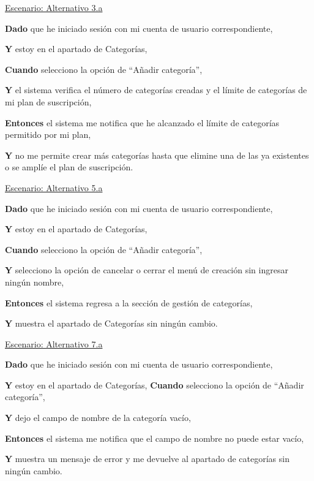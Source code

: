 \vspace{0.20cm}



\underline{Escenario: Alternativo 3.a}\par
\vspace{0.15cm}

\textbf{Dado} que he iniciado sesión con mi cuenta de usuario correspondiente,\par
\textbf{Y} estoy en el apartado de Categorías,\par
\textbf{Cuando} selecciono la opción de \enquote{Añadir categoría},\par
\textbf{Y} el sistema verifica el número de categorías creadas y el límite de categorías de mi plan de suscripción,\par
\textbf{Entonces} el sistema me notifica que he alcanzado el límite de categorías permitido por mi plan,\par
\textbf{Y} no me permite crear más categorías hasta que elimine una de las ya existentes o se amplíe el plan de suscripción.\par
\vspace{0.20cm}

\underline{Escenario: Alternativo 5.a}\par
\vspace{0.15cm}

\textbf{Dado} que he iniciado sesión con mi cuenta de usuario correspondiente,\par
\textbf{Y} estoy en el apartado de Categorías,\par
\textbf{Cuando} selecciono la opción de \enquote{Añadir categoría},\par
\textbf{Y} selecciono la opción de cancelar o cerrar el menú de creación sin ingresar ningún nombre,\par
\textbf{Entonces} el sistema regresa a la sección de gestión de categorías,\par
\textbf{Y} muestra el apartado de Categorías sin ningún cambio.\par

\vspace{0.20cm}

\underline{Escenario: Alternativo 7.a}\par
\vspace{0.15cm}

\textbf{Dado} que he iniciado sesión con mi cuenta de usuario correspondiente,\par
\textbf{Y} estoy en el apartado de Categorías,
\textbf{Cuando} selecciono la opción de \enquote{Añadir categoría},\par
\textbf{Y} dejo el campo de nombre de la categoría vacío,\par
\textbf{Entonces} el sistema me notifica que el campo de nombre no puede estar vacío,\par
\textbf{Y} muestra un mensaje de error y me devuelve al apartado de categorías sin ningún cambio.\par

